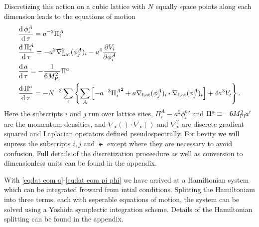 Discretizing this action on a cubic lattice with $N$ equally space points along each dimension leads to the equations of motion
\begin{align}
  & \frac{\mathrm{d}\,\phi^A_i}{\mathrm{d}\,\tau} = a^{-2}\Pi^A_i  \label{eq:lat eom a}\\
  & \frac{\mathrm{d}\,\Pi^A_i}{\mathrm{d}\,\tau} = -a^2\nabla^2_{\mathrm{Lat}}(\phi^A_j)_i -a^4\frac{\partial V_i}{\partial \phi^A_i}  \label{eq:lat eom pi a}\\
  & \frac{\mathrm{d}\, a}{\mathrm{d}\,\tau} = -\frac{1}{6M_{\mathrm{Pl}}^2}\Pi^a  \label{eq:lat eom phi}\\
  & \frac{\mathrm{d}\,\Pi^a}{\mathrm{d}\,\tau} = -N^{-3}\sum_i\left\{
  \sum_A\left[-a^{-3}{\Pi^A_i}^2 + a\nabla_{\mathrm{Lat}}(\phi^A_j)_i\cdot\nabla_{\mathrm{Lat}}(\phi^A_j)_i \right]
  + 4a^3V_i\right\}.  \label{eq:lat eom pi phi}  
\end{align}
Here the subscripts $i$ and $j$ run over lattice sites, $\Pi^A_i \equiv a^2{\phi^a_i}'$ and $\Pi^a \equiv -6M_{\mathrm{Pl}}^2a'$ are the momentum densities, and $\nabla_\lat()\cdot\nabla_\lat()$ and $\nabla^2_\lat$ are discrete gradient squared and Laplacian operators defined pseudospectrally.
For bevity we will supress the subscripts $i,j$ and $\lat$ except where they are necessary to avoid confusion.
Full details of the discretization proceedure as well as conversion to dimensionless units can be found in the appendix.


With \eqref{eq:lat eom a}-\eqref{eq:lat eom pi phi} we have arrived at a Hamiltonian system which can be integrated froward from intial conditions.
Splitting the Hamiltoniam into three terms, each with seperable equations of motion, the system can be solved using a Yoshida symplectic integration scheme.
Details of the Hamiltonian splitting can be found in the appendix.

